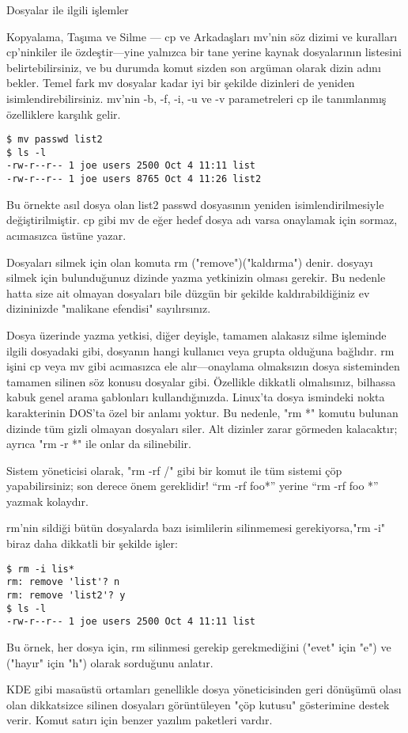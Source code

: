 \begin{section}{Dosyalar ile ilgili işlemler}
\begin{subsection}{Kopyalama, Taşıma ve Silme — cp ve Arkadaşları}
mv'nin söz dizimi ve kuralları cp'ninkiler ile özdeştir—yine yalnızca bir tane yerine kaynak dosyalarının listesini belirtebilirsiniz, ve bu durumda komut sizden son argüman olarak dizin adını bekler. Temel fark mv dosyalar kadar iyi bir şekilde dizinleri de yeniden isimlendirebilirsiniz.
mv'nin -b, -f, -i, -u ve -v parametreleri cp ile tanımlanmış özelliklere karşılık gelir.
\begin{verbatim}
$ mv passwd list2
$ ls -l
-rw-r--r-- 1 joe users 2500 Oct 4 11:11 list
-rw-r--r-- 1 joe users 8765 Oct 4 11:26 list2
\end{verbatim}
Bu örnekte asıl dosya olan list2 passwd dosyasının yeniden isimlendirilmesiyle değiştirilmiştir. cp gibi mv de eğer hedef dosya adı varsa onaylamak için sormaz, acımasızca üstüne yazar.

Dosyaları silmek için olan komuta rm ("remove")("kaldırma") denir. dosyayı silmek için bulunduğunuz dizinde yazma yetkinizin olması gerekir. Bu nedenle hatta size ait olmayan dosyaları bile düzgün bir şekilde kaldırabildiğiniz ev dizininizde "malikane efendisi" sayılırsınız.

Dosya üzerinde yazma yetkisi, diğer deyişle, tamamen alakasız silme işleminde ilgili dosyadaki gibi, dosyanın hangi kullanıcı veya grupta olduğuna bağlıdır. rm işini cp veya mv gibi acımasızca ele alır—onaylama olmaksızın dosya sisteminden tamamen silinen söz konusu dosyalar gibi. Özellikle dikkatli olmalısınız,  bilhassa kabuk genel arama şablonları kullandığınızda. Linux'ta dosya ismindeki nokta karakterinin DOS'ta özel bir anlamı yoktur. Bu nedenle, "rm *" komutu bulunan dizinde tüm gizli olmayan dosyaları siler. Alt dizinler zarar görmeden kalacaktır; ayrıca "rm -r *" ile onlar da silinebilir.

Sistem yöneticisi olarak, "rm -rf /" gibi bir komut ile tüm sistemi çöp yapabilirsiniz; son derece önem gereklidir!  “rm -rf foo*” yerine “rm -rf foo *” yazmak kolaydır.

rm'nin sildiği bütün dosyalarda bazı isimlilerin silinmemesi gerekiyorsa,"rm -i" biraz daha dikkatli bir şekilde işler:
\begin{verbatim}
$ rm -i lis*
rm: remove 'list'? n
rm: remove 'list2'? y
$ ls -l
-rw-r--r-- 1 joe users 2500 Oct 4 11:11 list
\end{verbatim}
Bu örnek, her dosya için, rm silinmesi gerekip gerekmediğini ("evet" için "e") ve ("hayır" için "h") olarak sorduğunu anlatır.

KDE gibi masaüstü ortamları genellikle dosya yöneticisinden geri dönüşümü olası olan dikkatsizce silinen dosyaları görüntüleyen "çöp kutusu" gösterimine destek verir. Komut satırı için benzer yazılım paketleri vardır.


\end{subsection}
\end{section}
